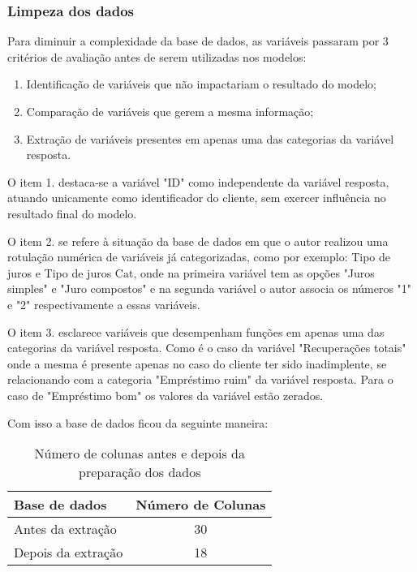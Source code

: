 \subsubsection{Limpeza dos dados}

Para diminuir a complexidade da base de dados, as variáveis passaram por 3 critérios de avaliação antes de serem utilizadas
nos modelos:

\begin{enumerate}
  \item Identificação de variáveis que não impactariam o resultado do modelo;
  \item Comparação de variáveis que gerem a mesma informação;
  \item Extração de variáveis presentes em apenas uma das categorias da variável resposta.
\end{enumerate}

O item 1. destaca-se a variável "ID" como independente da variável resposta, 
atuando unicamente como identificador do cliente, sem exercer influência no resultado final do modelo.

O item 2. se refere à situação da base de dados em que o autor realizou uma rotulação numérica de variáveis 
já categorizadas, como por exemplo: 
Tipo de juros e Tipo de juros Cat, onde na primeira variável tem as opções "Juros simples" e "Juro compostos" e na segunda variável
o autor associa os números "1" e "2" respectivamente a essas variáveis.

O item 3. esclarece variáveis que desempenham funções em apenas uma das categorias da variável resposta. Como é o caso da 
variável "Recuperações totais" onde a mesma é presente apenas no caso do cliente ter sido inadimplente, se relacionando
com a categoria "Empréstimo ruim" da variável resposta. Para o caso de "Empréstimo bom" os valores da variável estão zerados.

Com isso a base de dados ficou da seguinte maneira:

\begin{table}[h]
  \centering
  \begin{tabular}{l|c}
  \hline
  \textbf{Base de dados} & \textbf{Número de Colunas} \\ \hline
  Antes da extração & 30 \\ 
  Depois da extração & 18 \\ \hline
  \end{tabular}
  \caption{Número de colunas antes e depois da preparação dos dados}
  \label{table:columns_before_after}
\end{table}

